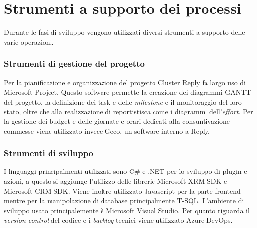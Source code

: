 \section{Strumenti a supporto dei processi}
Durante le fasi di sviluppo vengono utilizzati diversi strumenti a supporto delle varie operazioni.

\subsubsection{Strumenti di gestione del progetto}
Per la pianificazione e organizzazione del progetto Cluster Reply fa largo uso di Microsoft Project. Questo software permette la creazione dei diagrammi GANTT del progetto, la definizione dei task e delle \textit{milestone} e il monitoraggio del loro stato, oltre che alla realizzazione di reportistisca come i diagrammi dell'\textit{effort}. 
Per la gestione dei budget e delle giornate e orari dedicati alla consuntivazione commesse viene utilizzato invece Geco, un software interno a Reply.

\subsubsection{Strumenti di sviluppo} I linguaggi principalmenti utilizzati sono C\# e .NET per lo sviluppo di plugin e azioni, a questo si aggiunge l'utilizzo delle librerie Microsoft XRM SDK e Microsoft CRM SDK.
Viene inoltre utilizzato Javascript per la parte frontend mentre per la manipolazione di database principalmente T-SQL. 
L'ambiente di sviluppo usato principalemente è Microsoft Visual Studio.
Per quanto riguarda il \textit{version control} del codice e i \textit{backlog} tecnici viene utilizzato Azure DevOps.



